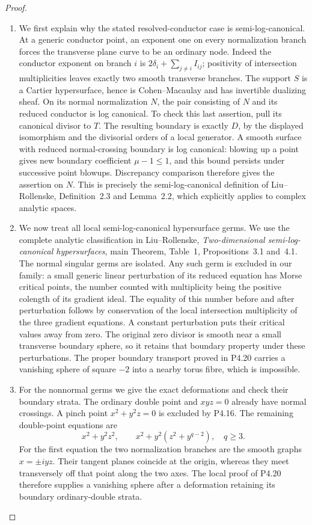 \begin{proof}

\begin{enumerate}[label={$\langle1\rangle$\arabic*.},leftmargin=*]
\item We first explain why the stated resolved-conductor
case is semi-log-canonical. At a generic conductor
point, an exponent one on every normalization
branch forces the transverse plane curve to be an
ordinary node. Indeed the conductor exponent on
branch $i$ is
$2\delta_i+\sum_{j\ne i}I_{ij}$; positivity of
intersection multiplicities leaves exactly two
smooth transverse branches. The support $S$ is a
Cartier hypersurface, hence is Cohen--Macaulay and
has invertible dualizing sheaf. On its normal
normalization $N$, the pair consisting of $N$
and its reduced conductor is log canonical.
To check this last assertion, pull its canonical
divisor to $T$. The resulting boundary is exactly
$D$, by the displayed isomorphism and the
divisorial orders of a local generator. A smooth
surface with reduced normal-crossing boundary is
log canonical: blowing up a point gives new
boundary coefficient $\mu-1\le1$, and this
bound persists under successive point blowups.
Discrepancy comparison therefore gives the
assertion on $N$. This is precisely the
semi-log-canonical definition of
Liu--Rollenske, Definition~2.3 and Lemma~2.2,
which explicitly applies to complex analytic
spaces.

\item We now treat all local semi-log-canonical
hypersurface germs. We use the complete analytic
classification in Liu--Rollenske,
\emph{Two-dimensional semi-log-canonical
hypersurfaces}, main Theorem, Table~1,
Propositions~3.1 and~4.1. The normal singular
germs are isolated. Any such germ is excluded
in our family: a small generic linear
perturbation of its reduced equation has
Morse critical points, the number counted
with multiplicity being the positive
colength of its gradient ideal. The equality
of this number before and after perturbation
follows by conservation of the local
intersection multiplicity of the three
gradient equations. A constant perturbation
puts their critical values away from zero.
The original zero divisor is smooth near
a small transverse boundary sphere, so it
retains that boundary property under these
perturbations. The proper boundary
transport proved in P4.20 carries a
vanishing sphere of square $-2$ into a
nearby torus fibre, which is impossible.

\item For the nonnormal germs we give the exact
deformations and check their boundary strata.
The ordinary double point and $xyz=0$
already have normal crossings. A pinch point
$x^2+y^2z=0$ is excluded by P4.16.
The remaining double-point equations are
\[
 x^2+y^2z^2,\qquad
 x^2+y^2(z^2+y^{q-2}),\quad q\ge3.
\]
For the first equation the two normalization
branches are the smooth graphs $x=\pm i yz$.
Their tangent planes coincide at the origin,
whereas they meet transversely off that point
along the two axes. The local proof of P4.20
therefore supplies a vanishing sphere after
a deformation retaining its boundary
ordinary-double strata.


\end{enumerate}
\end{proof}
